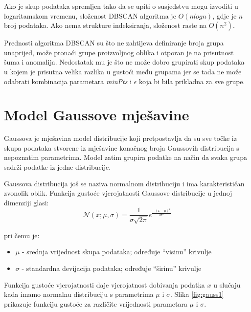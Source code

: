 \documentclass[utf8, diplomski, numeric]{fer}
\begin{document}
Ako je skup podataka spremljen tako da se upiti o susjedstvu mogu izvoditi u logaritamskom vremenu, složenost DBSCAN algoritma je $O(n log n)$, gdje je $n$ broj podataka. Ako nema strukture indeksiranja, složenost raste na $O(n^2)$.

Prednosti algoritma DBSCAN su što ne zahtijeva definiranje broja grupa unaprijed, može pronaći grupe proizvoljnog oblika i otporan je na prisutnost šuma i anomalija. Nedostatak mu je što ne može dobro grupirati skup podataka u kojem je prisutna velika razlika u gustoći među grupama jer se tada ne može odabrati kombinacija parametara \textit{minPts} i $\epsilon$ koja bi bila prikladna za sve grupe. 

\section{Model Gaussove mješavine}

Gaussova je mješavina model distribucije koji pretpostavlja da su sve točke iz skupa podataka stvorene iz mješavine konačnog broja Gaussovih distribucija s nepoznatim parametrima. Model zatim grupira podatke na način da svaka grupa sadrži podatke iz jedne distribucije.

Gaussova distribucija još se naziva normalnom distribuciju i ima karakterističan zvonolik oblik. Funkcija gustoće vjerojatnosti Gaussove distribucije u jednoj dimenziji glasi:
\begin{equation} \label{eq:gauss1}
\mathcal{N}(x;\mu,\sigma) = \frac{1}{{\sigma \sqrt {2\pi } }}e^{\frac{-(x - \mu)^2 }{2\sigma ^2 }}
\end{equation}

pri čemu je:
\begin{itemize}
\item $\mu$ - srednja vrijednost skupa podataka; određuje ``visinu'' krivulje
\item $\sigma$ - standardna devijacija podataka; određuje ``širinu'' krivulje
\end{itemize}

Funkcija gustoće vjerojatnosti daje vjerojatnost dobivanja podatka $x$ u slučaju kada imamo normalnu distribuciju s parametrima $\mu$ i $\sigma$. Slika \ref{fig:gauss1} prikazuje funkciju gustoće za različite vrijednosti parametara $\mu$ i $\sigma$.
\end{document}
